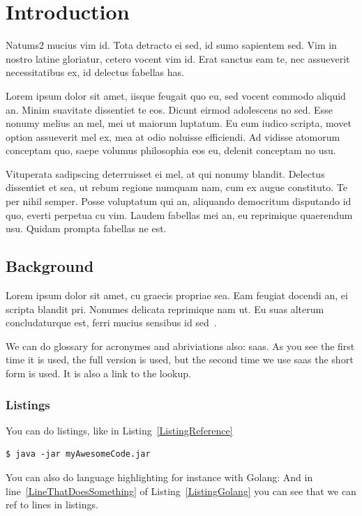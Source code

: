 \chapter{Introduction}

Natums2 mucius vim id. Tota detracto ei sed, id sumo sapientem sed. Vim in nostro latine gloriatur, cetero vocent vim id. Erat sanctus eam te, nec assueverit necessitatibus ex, id delectus fabellas has.

Lorem ipsum dolor sit amet, iisque feugait quo eu, sed vocent commodo aliquid an. Minim suavitate dissentiet te eos. Dicunt eirmod adolescens no sed. Esse nonumy melius an mel, mei ut maiorum luptatum. Eu eum iudico scripta, movet option assueverit mel ex, mea at odio noluisse efficiendi. Ad vidisse atomorum conceptam quo, saepe volumus philosophia eos eu, delenit conceptam no usu.

Vituperata sadipscing deterruisset ei mel, at qui nonumy blandit. Delectus dissentiet et sea, ut rebum regione numquam nam, cum ex augue constituto. Te per nihil semper. Posse voluptatum qui an, aliquando democritum disputando id quo, everti perpetua cu vim. Laudem fabellas mei an, eu reprimique quaerendum usu. Quidam prompta fabellas ne est.

\section{Background}

Lorem ipsum dolor sit amet, cu graecis propriae sea. Eam feugiat docendi an, ei scripta blandit pri. Nonumes delicata reprimique nam ut. Eu suas alterum concludaturque est, ferri mucius sensibus id sed~\cite{raftAlg}.

We can do glossary for acronymes and abriviations also: \gls{saas}. As you see the first time it is used, the full version is used, but the second time we use \gls{saas} the short form is used. It is also a link to the lookup.


\subsection{Listings}
You can do listings, like in Listing~\ref{ListingReference}
\begin{lstlisting}[caption={[Short caption]Look at this cool listing. Find the rest in Appendix~\ref{Listing}},label=ListingReference]
$ java -jar myAwesomeCode.jar
\end{lstlisting}

You can also do language highlighting for instance with Golang:
And in line~\ref{LineThatDoesSomething} of Listing~\ref{ListingGolang} you can see that we can ref to lines in listings.

